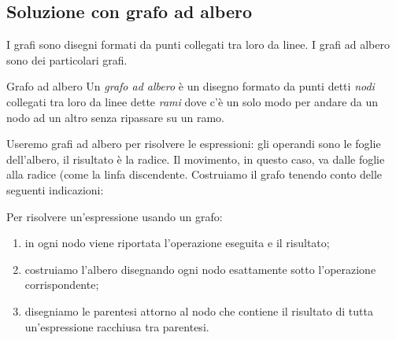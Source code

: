 \subsection{Soluzione con grafo ad albero}

I grafi sono disegni formati da punti collegati tra loro da linee. 
I grafi ad albero sono dei particolari grafi.

\begin{definizione}{Grafo ad albero}{}
Un \emph{grafo ad albero} è un disegno formato da punti detti \emph{nodi} 
collegati tra loro da linee dette \emph{rami} dove c'è un solo modo per 
andare da un nodo ad un altro senza ripassare su un ramo.
\end{definizione}


Useremo grafi ad albero per risolvere le espressioni:
gli operandi sono le foglie dell'albero, il risultato è la radice. 
Il movimento, in questo caso, va dalle foglie alla radice (come la linfa 
discendente.
Costruiamo il grafo tenendo conto delle seguenti indicazioni:

\begin{procedura}{}{}
 Per risolvere un'espressione usando un grafo:
\begin{enumerate} [noitemsep]
 \item in ogni nodo viene riportata l'operazione eseguita e il risultato;
 \item costruiamo l'albero disegnando ogni nodo esattamente sotto
  l'operazione corrispondente;
 \item disegniamo le parentesi attorno al nodo che contiene il
  risultato di tutta un'espressione racchiusa tra parentesi.
\end{enumerate}
\end{procedura}


